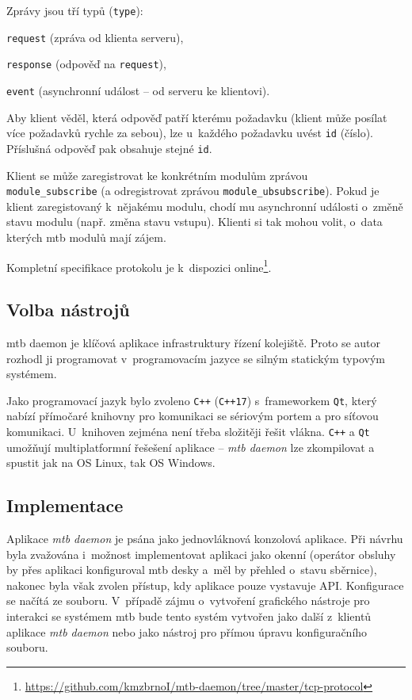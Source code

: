 Zprávy jsou tří typů (\texttt{type}):

\begin{compactenum}
\item \texttt{request} (zpráva od klienta serveru),
\item \texttt{response} (odpověď na \texttt{request}),
\item \texttt{event} (asynchronní událost – od serveru ke klientovi).
\end{compactenum}

Aby klient věděl, která odpověď patří kterému požadavku (klient může posílat
více požadavků rychle za sebou), lze u~každého požadavku uvést \texttt{id}
(číslo). Příslušná odpověď pak obsahuje stejné \texttt{id}.

Klient se může zaregistrovat ke konkrétním modulům zprávou \\
\texttt{module\_subscribe} (a odregistrovat zprávou
\texttt{module\_ubsubscribe}). Pokud je klient zaregistovaný k~nějakému modulu,
chodí mu asynchronní události o~změně stavu modulu (např. změna stavu vstupu).
Klienti si tak mohou volit, o~data kterých \gls{mtb} modulů mají zájem.

Kompletní specifikace protokolu je k~dispozici
online\footnote{\url{https://github.com/kmzbrnoI/mtb-daemon/tree/master/tcp-protocol}}.

\subsection{Volba nástrojů} \label{sec:daemon:tools}

\gls{mtb} daemon je klíčová aplikace infrastruktury řízení kolejiště. Proto se
autor rozhodl ji programovat v~programovacím jazyce se silným statickým typovým
systémem.

Jako programovací jazyk bylo zvoleno \texttt{C++} (\texttt{C++17})
s~frameworkem \texttt{Qt}, který nabízí přímočaré knihovny pro komunikaci se
sériovým portem a pro síťovou komunikaci. U~knihoven zejména není třeba
složitěji řešit vlákna. \texttt{C++} a \texttt{Qt} umožňují multiplatformní
řešešení aplikace – \textit{\gls{mtb} daemon} lze zkompilovat a spustit jak na
OS Linux, tak OS Windows.

\subsection{Implementace} \label{sec:daemon:impl}

Aplikace \textit{\gls{mtb} daemon} je psána jako jednovláknová konzolová aplikace.
Při návrhu byla zvažována i~možnost implementovat aplikaci jako okenní
(operátor obsluhy by přes aplikaci konfiguroval \gls{mtb} desky a~měl by
přehled o~stavu sběrnice), nakonec byla však zvolen přístup, kdy aplikace pouze
vystavuje API. Konfigurace se načítá ze souboru. V~případě zájmu o~vytvoření
grafického nástroje pro interakci se systémem \gls{mtb} bude tento systém
vytvořen jako další z~klientů aplikace \textit{\gls{mtb} daemon} nebo jako
nástroj pro přímou úpravu konfiguračního souboru.

